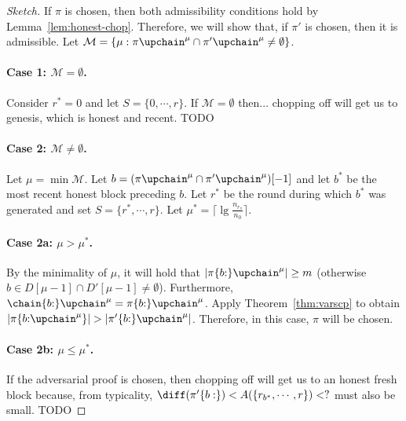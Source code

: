 \begin{proof}[Sketch]
  If $\pi$ is chosen, then both admissibility conditions hold by
  Lemma~\ref{lem:honest-chop}.
  Therefore, we will show that, if $\pi'$ is chosen, then it is admissible.
  Let $\mathcal{M} =
  \{\mu: \pi\upchain^\mu \cap \pi'\upchain^\mu \neq \emptyset\}$.
  \paragraph{Case 1: $\mathcal{M} = \emptyset$.}
  Consider $r^* = 0$ and let $S = \{0, \cdots, r\}$.
  If $\mathcal{M} = \emptyset$ then... chopping off will get us to genesis,
  which is honest and recent. TODO
  \paragraph{Case 2: $\mathcal{M} \neq \emptyset$.}
  Let
  $\mu = \min\mathcal{M}$. Let
  $b = (\pi\upchain^\mu \cap \pi'\upchain^\mu)[-1]$
  and let $b^*$ be the most recent honest block preceding $b$.
  Let $r^*$ be the round during which $b^*$ was generated
  and set $S = \{r^*, \cdots, r\}$.
  Let $\mu^* = \lceil\lg\frac{n_{r_\pi}}{n_0}\rceil$.
  \paragraph{Case 2a: $\mu > \mu^*$.}
  By the minimality of $\mu$, it will hold that
  $|\pi\{b{:}\}\upchain^\mu| \geq m$ (otherwise
  $b \in D[\mu - 1] \cap D'[\mu - 1] \neq \emptyset$).
  Furthermore, $\chain\{b{:}\}\upchain^\mu = \pi\{b{:}\}\upchain^\mu$.
  Apply Theorem~\ref{thm:varscp} to obtain
  $|\pi\{b{:}\upchain^\mu\}| > |\pi'\{b{:}\}\upchain^\mu|$.
  Therefore, in this case, $\pi$ will be chosen.
  \paragraph{Case 2b: $\mu \leq \mu^*$.}
  If the adversarial proof is chosen, then chopping off will get us to an
  honest fresh block because, from typicality,
  $\diff(\pi'\{b:\}) < A(\{r_{b^*}, \cdots, r\}) < ?$ must also be small. TODO
\end{proof}

